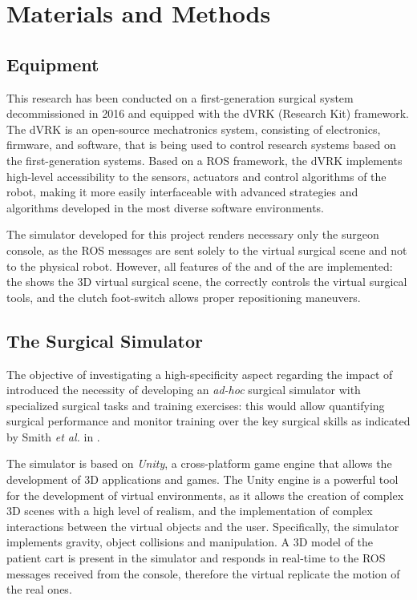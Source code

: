 \documentclass[../main.tex]{subfiles}
\begin{document}
\section{Materials and Methods}

\subsection{Equipment}
This research has been conducted on a first-generation \davinci surgical system decommissioned in 2016 and equipped with the dVRK (\davinci Research Kit) framework. The dVRK \cite{Kazanzides2014} is an open-source mechatronics system, consisting of electronics, firmware, and software, that is being used to control research systems based on the first-generation \davinci systems. Based on a ROS \cite{Quigley2009} framework, the dVRK implements high-level accessibility to the sensors, actuators and control algorithms of the \davinci robot, making it more easily interfaceable with advanced strategies and algorithms developed in the most diverse software environments.

The simulator developed for this project renders necessary only the surgeon console, as the ROS messages are sent solely to the virtual surgical scene and not to the physical robot. However, all features of the \psms and of the \ecm are implemented: the \hrsv shows the 3D virtual surgical scene, the \mtms correctly controls the virtual surgical tools, and the clutch foot-switch allows proper repositioning maneuvers. 

\subsection{The Surgical Simulator} 
The objective of investigating a high-specificity aspect regarding the impact of \vfs introduced the necessity of developing an \textit{ad-hoc} surgical simulator with specialized surgical tasks and training exercises: this would allow quantifying surgical performance and monitor training over the key surgical skills as indicated by Smith \textit{et al.} in \cite{Smith2014}. 

The simulator is based on \textit{Unity}, a cross-platform game engine that allows the development of 3D applications and games. The Unity engine is a powerful tool for the development of virtual environments, as it allows the creation of complex 3D scenes with a high level of realism, and the implementation of complex interactions between the virtual objects and the user. Specifically, the simulator implements gravity, object collisions and manipulation. A 3D model of the \davinci patient cart is present in the simulator and responds in real-time to the ROS messages received from the console, therefore the virtual \psms replicate the motion of the real ones. 
\end{document}
